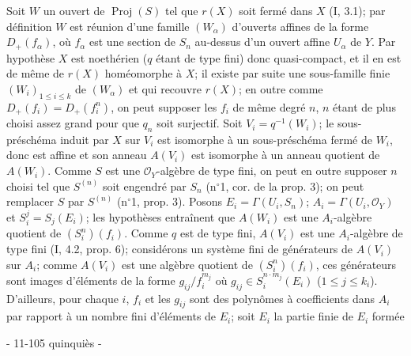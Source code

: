 Soit $W$ un ouvert de $\operatorname{Proj}(S)$ tel que $r(X)$ soit fermé dans $X$ (I, 3.1); par définition $W$ est réunion d'une famille $(W_\alpha)$ d'ouverts affines de la forme $D_+(f_\alpha)$, où $f_\alpha$ est une section de $S_n$ au-dessus d'un ouvert affine $U_\alpha$ de $Y$. Par hypothèse $X$ est noethérien ($q$ étant de type fini) donc quasi-compact, et il en est de même de $r(X)$ homéomorphe à $X$; il existe par suite une sous-famille finie $(W_i)_{1 \le i \le k}$ de $(W_\alpha)$ et qui recouvre $r(X)$; en outre comme $D_+(f_i) = D_+(f_i^n)$, on peut supposer les $f_i$ de même degré $n$, $n$ étant de plus choisi assez grand pour que $q_n$ soit surjectif. Soit $V_i = q^{-1}(W_i)$; le sous-préschéma induit par $X$ sur $V_i$ est isomorphe à un sous-préschéma fermé de $W_i$, donc est affine et son anneau $A(V_i)$ est isomorphe à un anneau quotient de $A(W_i)$. Comme $S$ est une $\mathcal{O}_Y$-algèbre de type fini, on peut en outre supposer $n$ choisi tel que $S^{(n)}$ soit engendré par $S_n$ (n$^\circ$1, cor. de la prop. 3); on peut remplacer $S$ par $S^{(n)}$ (n$^\circ$1, prop. 3). Posons $E_i = \Gamma(U_i, S_n)$; $A_i = \Gamma(U_i, \mathcal{O}_Y)$ et $S_i^j = S_j(E_i)$; les hypothèses entraînent que $A(W_i)$ est une $A_i$-algèbre quotient de $(S_i^n)(f_i)$. Comme $q$ est de type fini, $A(V_i)$ est une $A_i$-algèbre de type fini (I, 4.2, prop. 6); considérons un système fini de générateurs de $A(V_i)$ sur $A_i$; comme $A(V_i)$ est une algèbre quotient de $(S_i^n)(f_i)$, ces générateurs sont images d'éléments de la forme $g_{ij}/f_i^{m_j}$ où $g_{ij} \in S_i^{n \cdot m_j}(E_i)$ ($1 \le j \le k_i$). D'ailleurs, pour chaque $i$, $f_i$ et les $g_{ij}$ sont des polynômes à coefficients dans $A_i$ par rapport à un nombre fini d'éléments de $E_i$; soit $E_i$ la partie finie de $E_i$ formée

\newpage


- 11-105 quinquiès -

